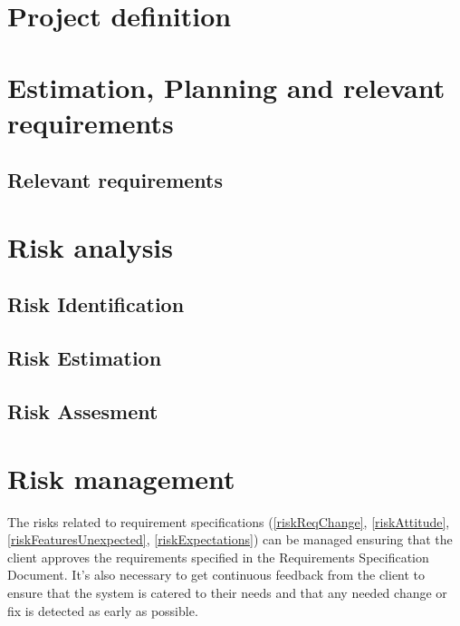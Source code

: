 \documentclass[11pt]{report}
\newcounter{risks}[subsection]
\begin{document}
\chapter{Project definition}
\label{chapDef}



\chapter{Estimation, Planning and relevant requirements}
\label{chapPlan}


\section{Relevant requirements}


\chapter{Risk analysis}
\label{chapRiskAnalysis}

\section{Risk Identification}
\label{secRiskIdentification}


\section{Risk Estimation}
\label{secRiskEstimation}


\section{Risk Assesment}
\label{secRiskAssesment}


\chapter{Risk management}
\label{chapRiskManagement}

The risks related to requirement specifications (\ref{riskReqChange}, \ref{riskAttitude}, \ref{riskFeaturesUnexpected}, \ref{riskExpectations}) can be managed ensuring that the client approves the requirements specified in the Requirements Specification Document. It's also necessary to get continuous feedback from the client to ensure that the system is catered to their needs and that any needed change or fix is detected as early as possible.
\end{document}
